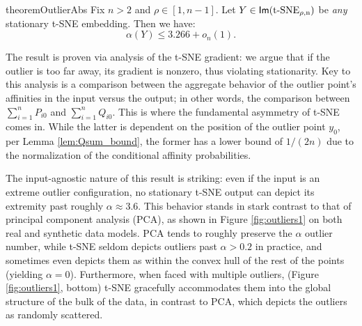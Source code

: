 \begin{restatable}{theorem}{OutlierAbs} 
\label{thm:outlier_abs}
Fix \(n > 2\) %
and \(\rho \in [1,n-1]\). Let \(Y \in {\operatorname*{\mathsf{Im}({\operatorname*{t-SNE}}_{\rho,n})}} \) be \emph{any} stationary t-SNE embedding. Then we have:
\[\alpha(Y) \leq %
3.266 + o_n(1).\]


\end{restatable}
The result is proven via analysis of the t-SNE gradient: we argue that if the outlier is too far away, its gradient is nonzero, thus violating stationarity. Key to this analysis is a comparison between the aggregate behavior of the outlier point's affinities in the input versus the output; in other words, the comparison between \(\sum_{i=1}^n P_{i0}\) and \(\sum_{i=1}^n Q_{i0}\). This is where the fundamental asymmetry of t-SNE comes in. While the latter is dependent on the position of the outlier point \(y_0\), per Lemma \ref{lem:Qsum_bound}, the former has a lower bound of \(1/(2n)\) due to the normalization of the conditional affinity probabilities. 


The input-agnostic nature of this result is striking: even if the input is an extreme outlier configuration, no stationary t-SNE output can depict its extremity past roughly \(\alpha \approx 3.6\). This behavior stands in stark contrast to that of principal component analysis (PCA), as shown in Figure \ref{fig:outliers1} on both real and synthetic data models. PCA tends to roughly preserve the \(\alpha\) outlier number, while t-SNE seldom depicts outliers past \(\alpha > 0.2\) in practice, and sometimes even depicts them as within the convex hull of the rest of the points (yielding \(\alpha = 0\)). Furthermore, when faced with multiple outliers, (Figure \ref{fig:outliers1}, bottom) t-SNE gracefully accommodates them into the global structure of the bulk of the data, in contrast to PCA, which depicts the outliers as randomly scattered. %

